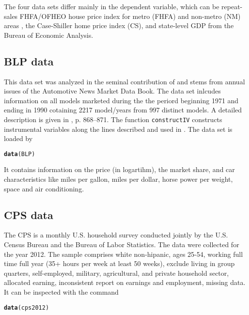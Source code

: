 \documentclass{amsart}\usepackage[]{graphicx}\usepackage[]{color}
\makeatletter
\newcommand{\hlstd}[1]{\textcolor[rgb]{0.345,0.345,0.345}{#1}}%
\newcommand{\hlkwd}[1]{\textcolor[rgb]{0.737,0.353,0.396}{\textbf{#1}}}%
\newenvironment{kframe}{%
 \def\at@end@of@kframe{}%
 \ifinner\ifhmode%
  \def\at@end@of@kframe{\end{minipage}}%
  \begin{minipage}{\columnwidth}%
 \fi\fi%
 \def\FrameCommand##1{\hskip\@totalleftmargin \hskip-\fboxsep
 \colorbox{shadecolor}{##1}\hskip-\fboxsep
     \hskip-\linewidth \hskip-\@totalleftmargin \hskip\columnwidth}%
 \MakeFramed {\advance\hsize-\width
   \@totalleftmargin\z@ \linewidth\hsize
   \@setminipage}}%
 {\par\unskip\endMakeFramed%
 \at@end@of@kframe}
\newenvironment{knitrout}{}{} %
\newcommand{\code}[1]{\texttt{#1}}
\makeatother
\begin{document}
The four data sets differ mainly in the dependent variable, which can be repeat-sales FHFA/OFHEO house price index for metro (FHFA) and non-metro (NM) areas , the Case-Shiller home price index (CS), and state-level GDP from the Bureau of Economic Analysis. 

\subsection{BLP data}
This data set was analyzed in the seminal contribution of \cite{BLP} and stems from annual issues of the Automotive News Market Data Book. The data set inlcudes information on all models marketed during the the periord beginning 1971 and ending in 1990 cotaining 2217 model/years from 997 distinct models. A detailed description is given in \cite{BLP}, p. 868--871. The function \code{constructIV} constructs instrumental variables along the lines described and used in \cite{BLP}. The data set is loaded by
\begin{knitrout}
\color{fgcolor}\begin{kframe}
\begin{alltt}
\hlkwd{data}\hlstd{(BLP)}
\end{alltt}
\end{kframe}
\end{knitrout}
It contains information on the price (in logartihm), the market share, and car characteristics like miles per gallon, miles per dollar, horse power per weight, space and air conditioning.

\subsection{CPS data}
The CPS is a monthly U.S. household survey conducted jointly by the U.S. Census Bureau and the Bureau of Labor Statistics. The data were collected for the year 2012. The sample comprises white non-hipanic, ages 25-54, working full time full year (35+ hours per week at least 50 weeks), exclude living in group quarters, self-employed, military, agricultural, and private household sector, allocated earning, inconsistent report on earnings and employment, missing data.
It can be inspected with the command
\begin{knitrout}
\color{fgcolor}\begin{kframe}
\begin{alltt}
\hlkwd{data}\hlstd{(cps2012)}
\end{alltt}
\end{kframe}
\end{knitrout}
\newpage
\footnotesize

%

\end{document}
